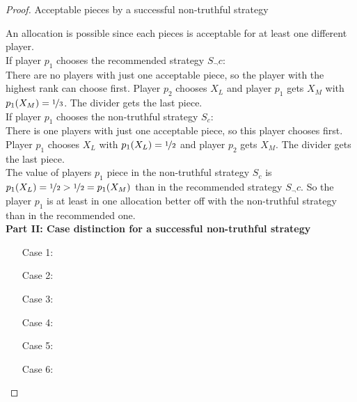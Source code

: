 \begin{proof}
\begin{table}[htb]
\caption{Acceptable pieces by a successful non-truthful strategy}\label{Table11}
\end{table}
\newpage An allocation is possible since each pieces is acceptable for at least one different player.\\ \newline If player $p_1$ chooses the recommended strategy $S_\neg c$:\\
There are no players with just one acceptable piece, so the player with the highest rank can choose first.
Player $p_2$ chooses $X_L$ and player $p_1$ gets $X_M$ with $p_1(X_M)= \nicefrac{1}{3}$. The divider gets the last piece.\\
\newline
If player $p_1$ chooses the non-truthful strategy $S_c$:\\
There is one players with just one acceptable piece, so this player chooses first.
Player $p_1$ chooses $X_L$ with $p_1(X_L)= \nicefrac{1}{2}$ and player $p_2$ gets $X_M$. The divider gets the last piece.\\
The value of players $p_1$ piece in the non-truthful strategy $S_c$ is $p_1(X_L)=\nicefrac{1}{2}>\nicefrac{1}{2}=p_1(X_M)$ than in the recommended strategy $S_\neg c$. So the player $p_1$ is at least in one allocation better off with the non-truthful strategy than in the recommended one.\\
\newline
\textbf{Part II: Case distinction for a successful non-truthful strategy} 
\begin{itemize}
\item[Case] 1: 
\item[Case] 2:
\item[Case] 3:
\item[Case] 4:
\item[Case] 5:
\item[Case] 6:
\end{itemize}
\end{proof}
\newpage
